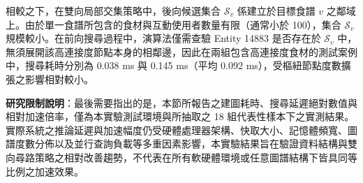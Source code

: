相較之下，在雙向局部交集策略中，後向候選集合 $\mathcal{S}_v$ 係建立於目標食譜 $v$ 之鄰域上。由於單一食譜所包含的食材與互動使用者數量有限（通常小於 100），集合 $\mathcal{S}_v$ 規模較小。在前向搜尋過程中，演算法僅需查驗 Entity 14883 是否存在於 $\mathcal{S}_v$ 中，無須展開該高連接度節點本身的相鄰邊，因此在兩組包含高連接度食材的測試案例中，搜尋耗時分別為 0.038 ms 與 0.145 ms（平均 0.092 ms），受樞紐節點度數擴張之影響相對較小。

\textbf{研究限制說明}：最後需要指出的是，本節所報告之建圖耗時、搜尋延遲絕對數值與相對加速倍率，僅為本實驗測試環境與所抽取之 18 組代表性樣本下之實測結果。實際系統之推論延遲與加速幅度仍受硬體處理器架構、快取大小、記憶體頻寬、圖譜度數分佈以及並行查詢負載等多重因素影響，本實驗結果旨在驗證資料結構與雙向尋路策略之相對改善趨勢，不代表在所有軟硬體環境或任意圖譜結構下皆具同等比例之加速效果。


